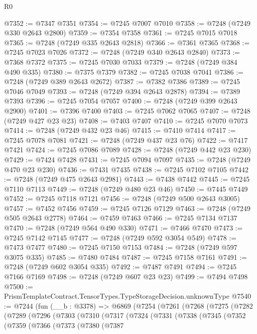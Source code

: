 \begin{lexlean}{R0}
\begin{coremodule}
@7352 := @7347 @7351
@7354 := @7245 @7007 @7010
@7358 := @7248 (@7249 @330 @2643 @2800)
@7359 := @7354 @7358
@7361 := @7245 @7015 @7018
@7365 := @7248 (@7249 @335 @2643 @2818)
@7366 := @7361 @7365
@7368 := @7245 @7023 @7026
@7372 := @7248 (@7249 @340 @2643 @2840)
@7373 := @7368 @7372
@7375 := @7245 @7030 @7033
@7379 := @7248 (@7249 @384 @490 @335)
@7380 := @7375 @7379
@7382 := @7245 @7038 @7041
@7386 := @7248 (@7249 @389 @2643 @2672)
@7387 := @7382 @7386
@7389 := @7245 @7046 @7049
@7393 := @7248 (@7249 @394 @2643 @2878)
@7394 := @7389 @7393
@7396 := @7245 @7054 @7057
@7400 := @7248 (@7249 @399 @2643 @2900)
@7401 := @7396 @7400
@7403 := @7245 @7062 @7065
@7407 := @7248 (@7249 @427 @23 @23)
@7408 := @7403 @7407
@7410 := @7245 @7070 @7073
@7414 := @7248 (@7249 @432 @23 @46)
@7415 := @7410 @7414
@7417 := @7245 @7078 @7081
@7421 := @7248 (@7249 @437 @23 @76)
@7422 := @7417 @7421
@7424 := @7245 @7086 @7089
@7428 := @7248 (@7249 @442 @23 @230)
@7429 := @7424 @7428
@7431 := @7245 @7094 @7097
@7435 := @7248 (@7249 @470 @23 @230)
@7436 := @7431 @7435
@7438 := @7245 @7102 @7105
@7442 := @7248 (@7249 @475 @2643 @2981)
@7443 := @7438 @7442
@7445 := @7245 @7110 @7113
@7449 := @7248 (@7249 @480 @23 @46)
@7450 := @7445 @7449
@7452 := @7245 @7118 @7121
@7456 := @7248 (@7249 @500 @2643 @3005)
@7457 := @7452 @7456
@7459 := @7245 @7126 @7129
@7463 := @7248 (@7249 @505 @2643 @2778)
@7464 := @7459 @7463
@7466 := @7245 @7134 @7137
@7470 := @7248 (@7249 @564 @490 @330)
@7471 := @7466 @7470
@7473 := @7245 @7142 @7145
@7477 := @7248 (@7249 @592 @3054 @549)
@7478 := @7473 @7477
@7480 := @7245 @7150 @7153
@7484 := @7248 (@7249 @597 @3075 @335)
@7485 := @7480 @7484
@7487 := @7245 @7158 @7161
@7491 := @7248 (@7249 @602 @3054 @335)
@7492 := @7487 @7491
@7494 := @7245 @7166 @7169
@7498 := @7248 (@7249 @607 @23 @23)
@7499 := @7494 @7498
@7500 := PrismTemplateContract.TensorTypes.TypeStorageDecision.unknownType
@7540 := @7244
    (fun (__b : @3378) =>
    @6869
      (@7254
        (@7261
          (@7268
            (@7275
              (@7282
                (@7289
                  (@7296
                    (@7303
                      (@7310
                        (@7317
                          (@7324
                            (@7331
                              (@7338
                                (@7345
                                  (@7352
                                    (@7359
                                      (@7366
                                        (@7373
                                          (@7380
                                            (@7387

\end{coremodule}
\end{lexlean}
